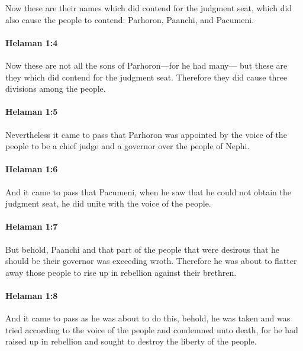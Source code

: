 			Now these are their names which did contend for the judgment seat,
			which did also cause the people to contend:
			Parhoron, Paanchi, and Pacumeni.

		\paragraph{Helaman 1:4} %
			\label{HELAMAN-1-4}

			Now these are not all the sons of Parhoron---for he had many---
			but these are they which did contend for the judgment seat.
			Therefore they did cause three divisions among the people.

		\paragraph{Helaman 1:5} %
			\label{HELAMAN-1-5}

			Nevertheless it came to pass that
			Parhoron was appointed by the voice of the people
			to be a chief judge and a governor over the people of Nephi.

		\paragraph{Helaman 1:6} %
			\label{HELAMAN-1-6}

			And it came to pass that Pacumeni,
			when he saw that he could not obtain the judgment seat,
			he did unite with the voice of the people.

		\paragraph{Helaman 1:7} %
			\label{HELAMAN-1-7}

			But behold, Paanchi and that part of the people
			that were desirous that he should be their governor
			was exceeding wroth.
			Therefore he was about to flatter away those people
			to rise up in rebellion against their brethren.

		\paragraph{Helaman 1:8} %
			\label{HELAMAN-1-8}

			And it came to pass as he was about to do this,
			behold, he was taken
			and was tried according to the voice of the people
			and condemned unto death,
			for he had raised up in rebellion
			and sought to destroy the liberty of the people.

